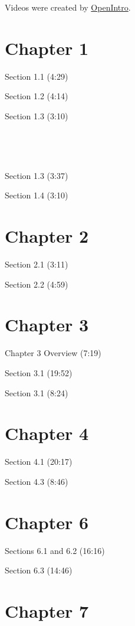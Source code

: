 \documentclass[
]{book}
\begin{document}
Videos were created by \href{https://www.openintro.org}{OpenIntro}.

\hypertarget{chapter-1}{%
\section{Chapter 1}\label{chapter-1}}

Section 1.1 (4:29)

Section 1.2 (4:14)

Section 1.3 (3:10)

~

~

Section 1.3 (3:37)

Section 1.4 (3:10)

\hypertarget{chapter-2}{%
\section{Chapter 2}\label{chapter-2}}

Section 2.1 (3:11)

Section 2.2 (4:59)

\hypertarget{chapter-3}{%
\section{Chapter 3}\label{chapter-3}}

Chapter 3 Overview (7:19)

Section 3.1 (19:52)

Section 3.1 (8:24)

\hypertarget{chapter-4}{%
\section{Chapter 4}\label{chapter-4}}

Section 4.1 (20:17)

Section 4.3 (8:46)

\hypertarget{chapter-6}{%
\section{Chapter 6}\label{chapter-6}}

Sections 6.1 and 6.2 (16:16)

Section 6.3 (14:46)

\hypertarget{chapter-7}{%
\section{Chapter 7}\label{chapter-7}}
\end{document}
